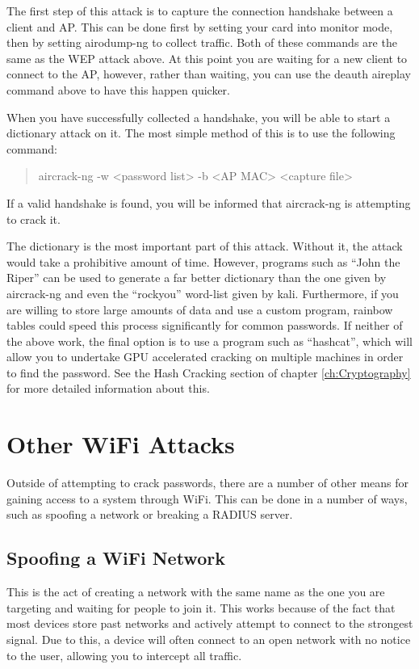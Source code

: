 \documentclass[a4paper,11pt]{report}
\begin{document}
			The first step of this attack is to capture the connection handshake between a client and AP. 
			This can be done first by setting your card into monitor mode, then by setting airodump-ng to collect traffic. 
			Both of these commands are the same as the WEP attack above. 
			At this point you are waiting for a new client to connect to the AP, however, rather than waiting, you can use the deauth aireplay command above to have this happen quicker. 

			When you have successfully collected a handshake, you will be able to start a dictionary attack on it. 
			The most simple method of this is to use the following command:
			\begin{quote}
				aircrack-ng -w <password list> -b <AP MAC> <capture file>
			\end{quote}
			If a valid handshake is found, you will be informed that aircrack-ng is attempting to crack it. 

			The dictionary is the most important part of this attack. 
			Without it, the attack would take a prohibitive amount of time. 
			However, programs such as ``John the Riper'' can be used to generate a far better dictionary than the one given by aircrack-ng and even the ``rockyou'' word-list given by kali. 
			Furthermore, if you are willing to store large amounts of data and use a custom program, rainbow tables could speed this process significantly for common passwords. 
			If neither of the above work, the final option is to use a program such as ``hashcat'', which will allow you to undertake GPU accelerated cracking on multiple machines in order to find the password. 
			See the Hash Cracking section of chapter \ref{ch:Cryptography} for more detailed information about this. 
	\section{Other WiFi Attacks}
		Outside of attempting to crack passwords, there are a number of other means for gaining access to a system through WiFi. 
		This can be done in a number of ways, such as spoofing a network or breaking a RADIUS server. 
		\subsection{Spoofing a WiFi Network}
			This is the act of creating a network with the same name as the one you are targeting and waiting for people to join it. 
			This works because of the fact that most devices store past networks and actively attempt to connect to the strongest signal. 
			Due to this, a device will often connect to an open network with no notice to the user, allowing you to intercept all traffic. 
\end{document}

